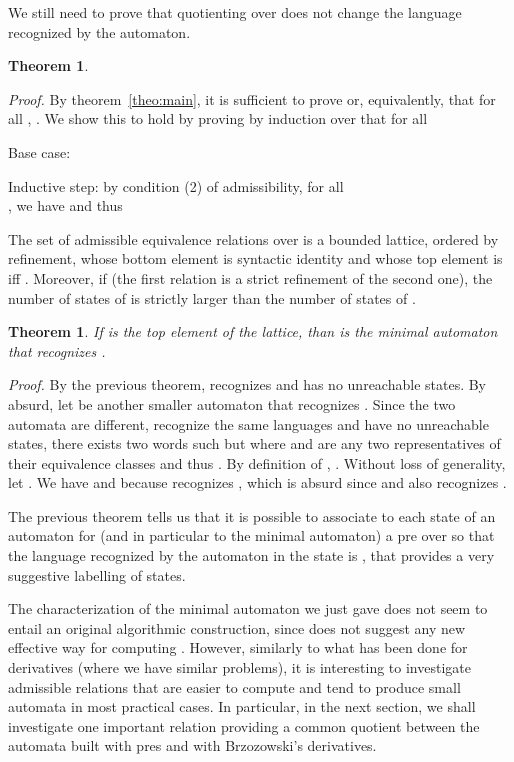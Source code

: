 \documentclass[preprint]{sigplanconf}
\newcounter{item}
\newtheorem{theorem}[item]{Theorem}
\newenvironment{proof}{\begin{trivlist}\item[]{\em Proof.}}{\end{trivlist}}
\begin{document}
We still need to prove that quotienting over  does not change the
language recognized by the automaton.

\begin{theorem}

\end{theorem}
\begin{proof}
By theorem~\ref{theo:main}, it is sufficient to prove
 or, equivalently, that for all ,
. We show this to hold by proving
by induction over  that for all 


\noindent
Base case:


\noindent
Inductive step:
by condition (2) of admissibility, for all\\ ,
we have  and thus


\end{proof}

The set of admissible equivalence relations over  is a bounded lattice,
ordered by refinement, whose bottom element is syntactic identity and whose
top element is  iff . Moreover, if
 (the first relation is a strict refinement of the
second one), the number of states of  is strictly larger
than the number of states of .

\begin{theorem}
If  is the top element of the lattice, than  is the
minimal automaton that recognizes .
\end{theorem}
\begin{proof}
By the previous theorem,  recognizes  and has no
unreachable states. By absurd, let
 be another smaller automaton that recognizes
. Since the two automata are different, recognize the same languages and
have no unreachable states, there exists two words  such
 but
 where  and 
are any two representatives of their equivalence classes and thus . By definition of , . Without loss
of generality, let . We have
 and  because  recognizes , which is absurd since
 and  also recognizes .
\end{proof}

The previous theorem tells us that it is possible to associate to each state
of an automaton for  (and in particular to the minimal automaton) 
a pre  over  so that the language recognized by the automaton 
in the state  is , that provides a very suggestive labelling
of states. 



The characterization of the minimal automaton we just gave does not
seem to entail an original algorithmic construction, since does
not suggest any new effective way for computing . However,
similarly to what has been done for derivatives (where we have similar
problems), it is interesting to investigate
admissible relations that are easier to compute and tend 
to produce small automata in most practical cases. 
In particular, in the next section, we shall investigate one important
relation providing a common quotient between the automata built
with pres and with Brzozowski's derivatives.
\end{document}
